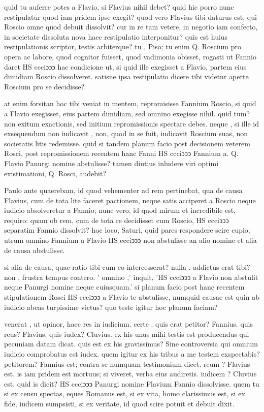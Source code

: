  quid tu auferre potes a Flavio, si Flavius nihil debet? quid hic porro nunc restipulatur quod iam pridem ipse exegit? quod vero Flavius tibi daturus est, qui Roscio omne quod debuit dissolvit? cur in re tam vetere, in negotio iam confecto, in societate dissoluta nova haec restipulatio interponitur? quis est huius restipulationis scriptor, testis arbiterque? tu , Piso; tu enim Q. Roscium pro opera ac labore, quod cognitor fuisset, quod vadimonia obisset, rogasti ut Fannio daret HS ccciↄↄↄ hac condicione ut, si quid ille exegisset a Flavio, partem eius dimidiam Roscio dissolveret. satisne ipsa restipulatio dicere tibi videtur aperte Roscium pro se decidisse?

 at enim forsitan hoc tibi veniat in mentem, repromisisse Fannium Roscio, si quid a Flavio exegisset, eius partem dimidiam, sed omnino exegisse nihil. quid tum? non exitum exactionis, sed initium repromissionis spectare debes. neque , si ille id exsequendum non iudicavit , non, quod in se fuit, iudicavit Roscium suas, non societatis litis redemisse. quid si tandem planum facio post decisionem veterem Rosci, post repromissionem recentem hanc Fanni HS ccciↄↄↄ Fannium a. Q. Flavio Panurgi nomine abstulisse? tamen diutius inludere viri optimi existimationi, Q. Rosci, audebit?

 Paulo ante quaerebam, id quod vehementer ad rem pertinebat, qua de causa Flavius, cum de tota lite faceret pactionem, neque satis acciperet a Roscio neque iudicio absolveretur a Fannio; nunc vero, id quod mirum et incredibile est, requiro: quam ob rem, cum de tota re decidisset cum Roscio, HS ccciↄↄↄ separatim Fannio dissolvit? hoc loco, Saturi, quid pares respondere scire cupio; utrum omnino Fannium a Flavio HS ccciↄↄↄ non abstulisse an alio nomine et alia de causa abstulisse.

 si alia de causa, quae ratio tibi cum eo intercesserat? nulla . addictus erat tibi? non . frustra tempus contero. ' omnino ,' inquit, 'HS ccciↄↄↄ a Flavio non abstulit neque Panurgi nomine neque cuiusquam.' si planum facio post hanc recentem stipulationem Rosci HS ccciↄↄↄ a Flavio te abstulisse, numquid causae est quin ab iudicio abeas turpissime victus? quo teste igitur hoc planum faciam?

 venerat , ut opinor, haec res in iudicium. certe . quis erat petitor? Fannius. quis reus? Flavius. quis iudex? Cluvius. ex his unus mihi testis est producendus qui pecuniam datam dicat. quis est ex his gravissimus? Sine controversia qui omnium iudicio comprobatus est iudex. quem igitur ex his tribus a me testem exspectabis? petitorem? Fannius est; contra se numquam testimonium dicet. reum ? Flavius est. is iam pridem est mortuus; si viveret, verba eius audiretis. iudicem ? Cluvius est. quid is dicit? HS ccciↄↄↄ Panurgi nomine Flavium Fannio dissolvisse. quem tu si ex censu spectas, eques Romanus est, si ex vita, homo clarissimus est, si ex fide, iudicem sumpsisti, si ex veritate, id quod scire potuit et debuit dixit.

